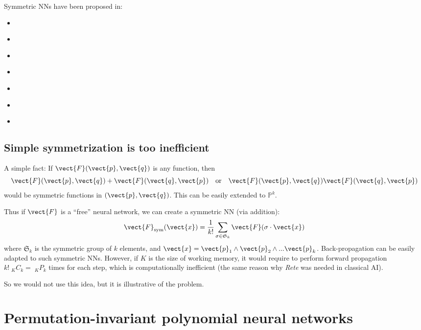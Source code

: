 Symmetric NNs have been proposed in:
\begin{itemize}
	\item \cite{Gens2014}
	\item \cite{Bie2019}
	\item \cite{Ravanbakhsh2016}
	\item \cite{Ravanbakhsh2017}
	\item \cite{Qi2016}
	\item \cite{Qi2017} 
	\item \cite{Zaheer2017}
\end{itemize}

\subsection{Simple symmetrization is too inefficient}

A simple fact:  If $\vect{F}(\vect{p},\vect{q})$ is any function, then
\begin{equation}
\vect{F}(\vect{p},\vect{q}) + \vect{F}(\vect{q},\vect{p}) \quad \mbox{or} \quad \vect{F}(\vect{p},\vect{q})  \vect{F}(\vect{q},\vect{p})
\end{equation}
would be symmetric functions in $(\vect{p},\vect{q})$.  This can be easily extended to $\mathbb{P}^k$.  %

Thus if $\vect{F}$ is a ``free'' neural network, we can create a symmetric NN (via addition):
\begin{equation}
\vect{F}_{\mathrm{sym}}(\vect{x}) = \frac{1}{k!} \sum_{\sigma \in \mathfrak{S}_k} \vect{F}(\sigma \cdot \vect{x})
\end{equation}
where $\mathfrak{S}_k$ is the symmetric group of $k$ elements, and $\vect{x} = \vect{p}_1 \wedge \vect{p}_2 \wedge ... \vect{p}_k$.  Back-propagation can be easily adapted to such symmetric NNs.  However, if $K$ is the size of working memory, it would require to perform forward propagation $k! \;_K C_k = \;_K P_k$ times for each step, which is computationally inefficient (the same reason why \textit{Rete} was needed in classical AI).

So we would not use this idea, but it is illustrative of the problem.

\section{Permutation-invariant polynomial neural networks}

